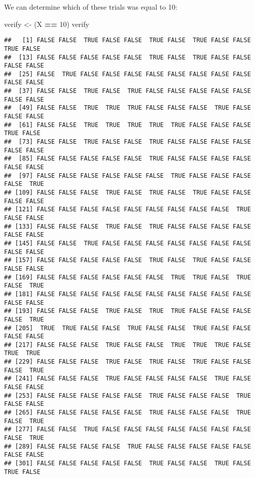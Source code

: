 \documentclass[
]{book}
\newenvironment{Shaded}{\begin{snugshade}}{\end{snugshade}}
\newcommand{\DecValTok}[1]{\textcolor[rgb]{0.00,0.00,0.81}{#1}}
\newcommand{\NormalTok}[1]{#1}
\newcommand{\OperatorTok}[1]{\textcolor[rgb]{0.81,0.36,0.00}{\textbf{#1}}}
\newcommand{\StringTok}[1]{\textcolor[rgb]{0.31,0.60,0.02}{#1}}
\begin{document}
We can determine which of these trials was equal to 10:

\begin{Shaded}
\begin{Highlighting}[]
\NormalTok{verify \textless{}{-}}\StringTok{ }\NormalTok{(X }\OperatorTok{==}\StringTok{ }\DecValTok{10}\NormalTok{)}
\NormalTok{verify}
\end{Highlighting}
\end{Shaded}

\begin{verbatim}
##   [1] FALSE FALSE  TRUE FALSE FALSE  TRUE FALSE  TRUE FALSE FALSE  TRUE FALSE
##  [13] FALSE FALSE FALSE FALSE FALSE  TRUE FALSE  TRUE FALSE FALSE FALSE FALSE
##  [25] FALSE  TRUE FALSE FALSE FALSE FALSE FALSE FALSE FALSE FALSE FALSE FALSE
##  [37] FALSE FALSE  TRUE FALSE  TRUE FALSE FALSE FALSE FALSE FALSE FALSE FALSE
##  [49] FALSE FALSE  TRUE  TRUE  TRUE FALSE FALSE FALSE  TRUE FALSE FALSE FALSE
##  [61] FALSE FALSE  TRUE  TRUE  TRUE  TRUE  TRUE FALSE FALSE FALSE  TRUE FALSE
##  [73] FALSE FALSE  TRUE FALSE FALSE  TRUE FALSE FALSE FALSE FALSE FALSE FALSE
##  [85] FALSE FALSE FALSE FALSE FALSE  TRUE FALSE FALSE FALSE FALSE FALSE FALSE
##  [97] FALSE FALSE FALSE FALSE FALSE FALSE  TRUE FALSE FALSE FALSE FALSE  TRUE
## [109] FALSE FALSE FALSE  TRUE FALSE  TRUE FALSE  TRUE FALSE FALSE FALSE FALSE
## [121] FALSE FALSE FALSE FALSE FALSE FALSE FALSE FALSE FALSE  TRUE FALSE FALSE
## [133] FALSE FALSE FALSE  TRUE FALSE  TRUE FALSE FALSE FALSE FALSE FALSE FALSE
## [145] FALSE FALSE  TRUE FALSE FALSE FALSE FALSE FALSE FALSE FALSE FALSE FALSE
## [157] FALSE FALSE FALSE FALSE FALSE  TRUE FALSE  TRUE FALSE FALSE FALSE FALSE
## [169] FALSE FALSE FALSE FALSE FALSE FALSE  TRUE  TRUE FALSE  TRUE FALSE  TRUE
## [181] FALSE FALSE FALSE FALSE FALSE FALSE FALSE FALSE FALSE FALSE FALSE FALSE
## [193] FALSE FALSE FALSE  TRUE FALSE  TRUE  TRUE FALSE FALSE FALSE FALSE  TRUE
## [205]  TRUE  TRUE FALSE FALSE  TRUE FALSE FALSE  TRUE FALSE FALSE FALSE FALSE
## [217] FALSE FALSE FALSE  TRUE FALSE FALSE  TRUE  TRUE  TRUE FALSE  TRUE  TRUE
## [229] FALSE FALSE FALSE  TRUE FALSE  TRUE FALSE  TRUE FALSE FALSE FALSE  TRUE
## [241] FALSE FALSE FALSE  TRUE FALSE FALSE FALSE FALSE  TRUE FALSE FALSE FALSE
## [253] FALSE FALSE FALSE FALSE FALSE  TRUE FALSE FALSE FALSE  TRUE FALSE FALSE
## [265] FALSE FALSE FALSE FALSE FALSE  TRUE FALSE FALSE FALSE  TRUE FALSE  TRUE
## [277] FALSE FALSE  TRUE FALSE FALSE FALSE FALSE FALSE FALSE FALSE FALSE  TRUE
## [289] FALSE FALSE FALSE FALSE  TRUE FALSE FALSE FALSE FALSE FALSE FALSE FALSE
## [301] FALSE FALSE FALSE FALSE FALSE  TRUE FALSE FALSE  TRUE FALSE  TRUE FALSE

\end{verbatim}
\end{document}
